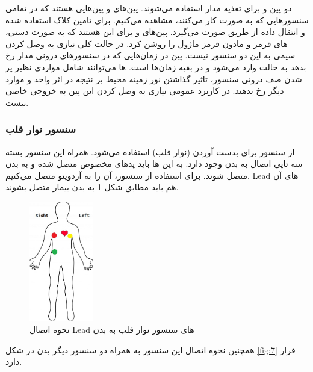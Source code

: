 دو پین  و  برای تغذیه مدار استفاده می‌شوند. پین‌های  و  پین‌هایی هستند که در تمامی سنسور‌هایی که به صورت  کار می‌کنند، مشاهده می‌کنیم.  برای تامین کلاک استفاده شده و انتقال داده از طریق  صورت می‌گیرد. پین‌های  و  برای این هستند که به صورت دستی،  های قرمز و مادون قرمز ماژول را روشن کرد. در حالت کلی نیازی به وصل کردن سیمی به این دو سنسور نیست. پین  در زمان‌هایی که در سنسور‌های درونی مدار  رخ بدهد به حالت  وارد می‌شود و در بقیه زمان‌ها  است.  ها می‌توانند شامل مواردی نظیر پر شدن صف  درونی سنسور، تاثیر گذاشتن نور زمینه محیط بر نتیجه در اثر  واحد  و موارد دیگر رخ بدهند. در کاربرد عمومی نیازی به وصل کردن این پین به خروجی خاصی نیست.

\subsubsection{سنسور نوار قلب}


از سنسور  برای بدست‌ آوردن  (نوار قلب) استفاده می‌شود. همراه این سنسور بسته  سه تایی اتصال به بدن وجود دارد. به این  ها باید پد‌های مخصوص متصل شده و به بدن متصل شوند. برای استفاده از سنسور،‌ آن را به آردوینو متصل می‌کنیم. Lead های‌ آن هم باید مطابق شکل \ref{fig:6} به بدن بیمار متصل بشوند.

\begin{figure}[h]
	\centering
	\includegraphics[width=0.25\textwidth]{figs/ecg.jpg}
	
	\caption{نحوه اتصال Lead‌ های سنسور نوار قلب به بدن}
	\label{fig:6}
\end{figure}



همچنین نحوه اتصال این سنسور به همراه دو سنسور دیگر بدن در شکل \ref{fig:7} قرار دارد.


